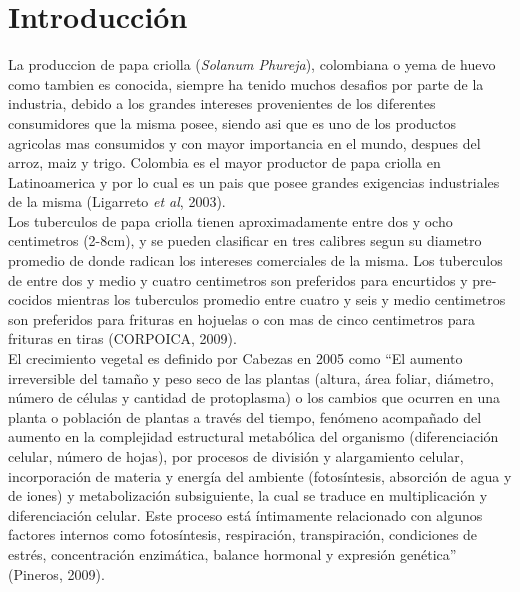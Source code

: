

\chapter*{Introducci\'on}

La produccion de papa criolla (\textit{Solanum Phureja}), colombiana o yema de huevo como tambien es conocida, siempre ha tenido muchos desafios por parte de la industria, debido a los grandes intereses provenientes de los diferentes consumidores que la misma posee, siendo asi que es uno de los productos agricolas mas consumidos y con mayor importancia en el mundo, despues del arroz, maiz y trigo. Colombia es el mayor productor de papa criolla en Latinoamerica y por lo cual es un pais que posee grandes exigencias industriales de la misma (Ligarreto \textit{et al}, 2003).\\

Los tuberculos de papa criolla tienen aproximadamente entre dos y ocho centimetros (2-8cm), y se pueden clasificar en tres calibres segun su diametro promedio de donde radican los intereses comerciales de la misma. Los tuberculos de entre dos y medio y cuatro centimetros son preferidos para encurtidos y pre-cocidos mientras los tuberculos promedio entre cuatro y seis y medio centimetros son preferidos para frituras en hojuelas o con mas de cinco centimetros para frituras en tiras (CORPOICA, 2009).\\

El crecimiento vegetal es definido por Cabezas en 2005 como "`El aumento irreversible del tamaño y peso seco de las plantas (altura, área foliar, diámetro, número de células y cantidad de protoplasma) o los cambios que ocurren en una planta o población de plantas a través del tiempo, fenómeno acompañado del aumento en la complejidad estructural metabólica del organismo (diferenciación celular, número de hojas), por procesos de división y alargamiento celular, incorporación de materia y energía del ambiente (fotosíntesis, absorción de agua y de iones) y metabolización subsiguiente, la cual se traduce en multiplicación y diferenciación celular. Este proceso está íntimamente relacionado con algunos factores internos como fotosíntesis, respiración, transpiración, condiciones de estrés, concentración enzimática, balance hormonal y expresión genética"' (Pineros, 2009).\\


